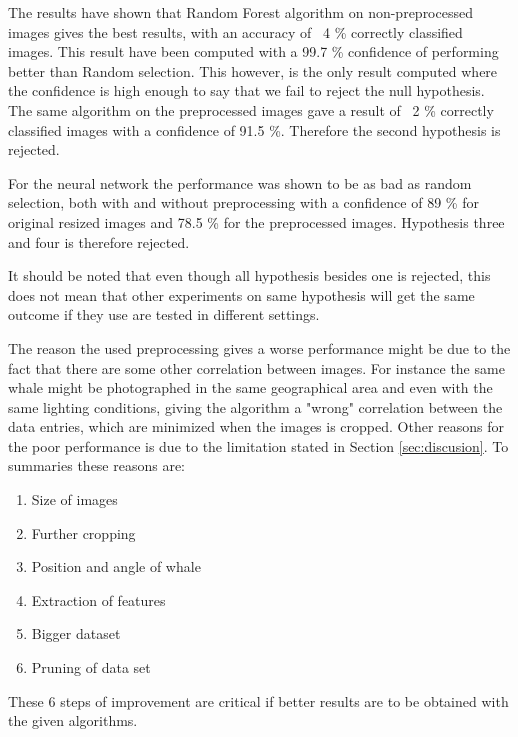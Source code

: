 The results have shown that Random Forest algorithm on non-preprocessed images gives the best results, with an accuracy of ~4 \% correctly classified images. This result have been computed with a 99.7 \% confidence of performing better than Random selection. This however, is the only result computed where the confidence is high enough to say that we fail to reject the null hypothesis.
The same algorithm on the preprocessed images gave a result of ~2 \% correctly classified images with a confidence of 91.5 \%. Therefore the second hypothesis is rejected.

For the neural network the performance was shown to be as bad as random selection, both with and without preprocessing with a confidence of 89 \% for original resized images and 78.5 \% for the preprocessed images. Hypothesis three and four is therefore rejected.

It should be noted that even though all hypothesis besides one is rejected, this does not mean that other experiments on same hypothesis will get the same outcome if they use are tested in different settings.

The reason the used preprocessing gives a worse performance might be due to the fact that there are some other correlation between images. For instance the same whale might be photographed in the same geographical area and even with the same lighting conditions, giving the algorithm a "wrong" correlation between the data entries, which are minimized when the images is cropped.
Other reasons for the poor performance is due to the limitation stated in Section \ref{sec:discusion}.
To summaries these reasons are:
\begin{enumerate}
\item Size of images 
\item Further cropping
\item Position and angle of whale
\item Extraction of features
\item Bigger dataset
\item Pruning of data set
\end{enumerate}
These 6 steps of improvement are critical if better results are to be obtained with the given algorithms. 

